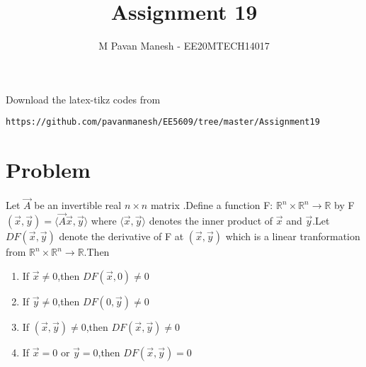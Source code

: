 \documentclass[journal,12pt]{IEEEtran}
\begin{document}
     \def\rightbox#1{\makebox[0in][r]{#1}}
     \def\centbox#1{\makebox[0in]{#1}}
     \def\topbox#1{\raisebox{-\baselineskip}[0in][0in]{#1}}
     \def\midbox#1{\raisebox{-0.5\baselineskip}[0in][0in]{#1}}
\vspace{3cm}
\title{Assignment 19}
\author{M Pavan Manesh - EE20MTECH14017}
\maketitle
\bigskip
\renewcommand{\thefigure}{\theenumi}
\renewcommand{\thetable}{\theenumi}
%
Download the latex-tikz codes from 
%
\begin{lstlisting}
https://github.com/pavanmanesh/EE5609/tree/master/Assignment19
\end{lstlisting}
\section{\textbf{Problem}}
Let $\vec{A}$ be an invertible real $n \times n$ matrix .Define a function F: $\mathbb{R}^n\times\mathbb{R}^n\rightarrow\mathbb{R}$  by F$(\vec{x},\vec{y})=\langle \vec{A}\vec{x},\vec{y} \rangle$ where $\langle \vec{x},\vec{y} \rangle$ denotes the inner product of $\vec{x}$ and  $\vec{y}$.Let  $DF(\vec{x},\vec{y})$ denote the derivative of F at $(\vec{x},\vec{y})$ which is a linear tranformation from $\mathbb{R}^n\times\mathbb{R}^n\rightarrow\mathbb{R}$.Then
\begin{enumerate}
\item If $\vec{x} \neq 0$,then $DF(\vec{x},0 ) \neq 0$
\item If $\vec{y} \neq 0$,then $DF(0,\vec{y} ) \neq 0$
\item If $(\vec{x},\vec{y}) \neq 0$,then $DF(\vec{x},\vec{y} ) \neq 0$
\item If $\vec{x} = 0$ or $\vec{y}=0$,then $DF(\vec{x},\vec{y})= 0$
\end{enumerate}
\end{document}
